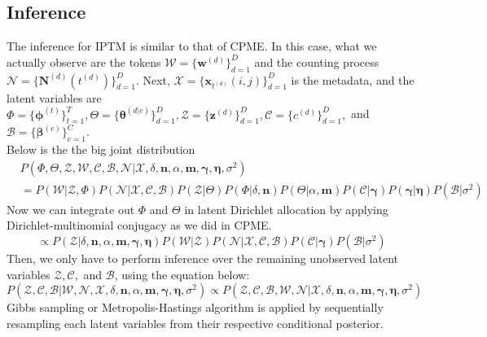 \documentclass[a4paper]{article}
\begin{document}
\subsection{Inference}
The inference for IPTM is similar to that of CPME. In this case, what we actually observe are the  tokens $\mathcal{W}=\{\boldsymbol{w}^{(d)} \}_{d=1}^{D}$ and the counting process $\mathcal{N}=\{\boldsymbol{N}^{(d)}(t^{(d)}) \}_{d=1}^{D}.$ Next,  $\mathcal{X}=\{\boldsymbol{x}_{t^{(d)}}(i, j)\}_{d=1}^{D}$ is the metadata, and the latent variables are $\Phi=\{\boldsymbol{\phi}^{(t)}\}_{t=1}^{T}, \Theta=\{\boldsymbol{\theta}^{(d|c)} \}_{d=1}^{D}, \mathcal{Z}=\{\boldsymbol{z}^{(d)} \}_{d=1}^{D}, \mathcal{C}=\{{c}^{(d)} \}_{d=1}^{D},$ and $\mathcal{B}=\{\boldsymbol{\beta}^{(c)} \}_{c=1}^{C}$.\\
\newline 
Below is the the big joint distribution
\begin{equation}
\begin{aligned}
& P(\Phi, \Theta, \mathcal{Z}, \mathcal{W}, \mathcal{C}, \mathcal{B}, \mathcal{N}| \mathcal{X}, \delta, \boldsymbol{n}, \alpha, \boldsymbol{m}, \boldsymbol{\gamma}, \boldsymbol{\eta}, \sigma^2) \\& = P( \mathcal{W}| \mathcal{Z}, \Phi)P(\mathcal{N}|\mathcal{X}, \mathcal{C}, \mathcal{B})P(\mathcal{Z}|\Theta)P(\Phi|\delta, \boldsymbol{n})P(\Theta|\alpha, \boldsymbol{m})P(\mathcal{C}|\boldsymbol{\gamma})P(\boldsymbol{\gamma}|\boldsymbol{\eta})P(\mathcal{B}|\sigma^2)
\end{aligned}
\end{equation}
Now we can integrate out $\Phi$ and $\Theta$ in latent Dirichlet allocation by applying Dirichlet-multinomial conjugacy as we did in CPME. 
\begin{equation}
\propto P( \mathcal{Z}|\delta, \boldsymbol{n}, \alpha, \boldsymbol{m}, \boldsymbol{\gamma}, \boldsymbol{\eta})P(\mathcal{W}|\mathcal{Z})P(\mathcal{N}|\mathcal{X}, \mathcal{C}, \mathcal{B})P(\mathcal{C}|\boldsymbol{\gamma})P(\mathcal{B}|\sigma^2)
\end{equation}
Then, we only have to perform inference over the remaining unobserved latent variables $\mathcal{Z}, \mathcal{C},$ and $\mathcal{B}$, using the equation below:
\begin{equation}
P( \mathcal{Z}, \mathcal{C}, \mathcal{B}|\mathcal{W}, \mathcal{N}, \mathcal{X}, \delta, \boldsymbol{n}, \alpha, \boldsymbol{m}, \boldsymbol{\gamma}, \boldsymbol{\eta}, \sigma^2) \propto P(\mathcal{Z}, \mathcal{C}, \mathcal{B}, \mathcal{W}, \mathcal{N} | \mathcal{X}, \delta, \boldsymbol{n}, \alpha, \boldsymbol{m}, \boldsymbol{\gamma}, \boldsymbol{\eta}, \sigma^2)
\end{equation}
 Gibbs sampling or Metropolis-Hastings algorithm is applied by sequentially resampling each latent variables from their respective conditional posterior.
\end{document}
